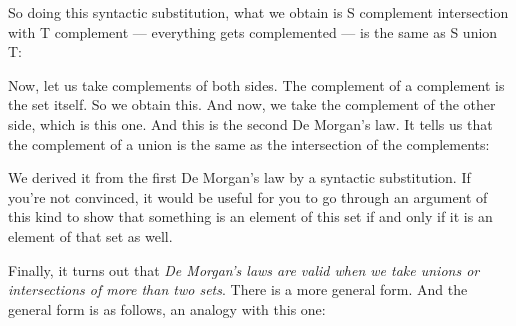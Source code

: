 \documentclass[pdftex, brazil, 12pt, twoside]{article}
\begin{document}
So doing this syntactic substitution, what we obtain
is S complement intersection with T complement ---
everything gets complemented ---
is the same as S union T:

\begin{figure}[H]
  \begin{center}
  \end{center}
\end{figure}

Now, let us take complements of both sides.
The complement of a complement is the set itself.
So we obtain this.
And now, we take the complement of the other side,
which is this one.
And this is the second De Morgan's law.
It tells us that the complement of a union is the
same as the intersection of the complements:

\begin{figure}[H]
  \begin{center}
  \end{center}
\end{figure}

We derived it from the first De Morgan's law by a syntactic
substitution.
If you're not convinced, it would be useful for you to go
through an argument of this kind to show that something is
an element of this set if and only if it is an element of
that set as well.

Finally, it turns out that \emph{De Morgan's laws are valid when
we take unions or intersections of
more than two sets}.
There is a more general form.
And the general form is as follows,
an analogy with this one:
\end{document}
